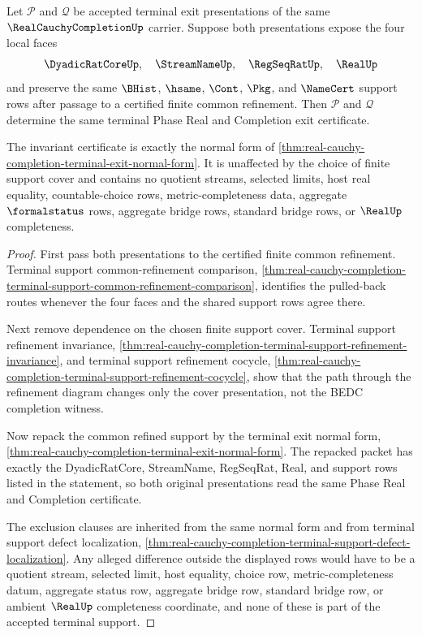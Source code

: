 \begin{theorem}
\label{thm:real-cauchy-completion-terminal-exit-support-invariance}
Let $\mathcal P$ and $\mathcal Q$ be accepted terminal exit presentations of the same $\RealCauchyCompletionUp$ carrier. Suppose both presentations expose the four local faces
$$
\DyadicRatCoreUp,\quad \StreamNameUp,\quad \RegSeqRatUp,\quad \RealUp
$$
and preserve the same $\BHist$, $\hsame$, $\Cont$, $\Pkg$, and $\NameCert$ support rows after passage to a certified finite common refinement. Then $\mathcal P$ and $\mathcal Q$ determine the same terminal Phase Real and Completion exit certificate.

The invariant certificate is exactly the normal form of \autoref{thm:real-cauchy-completion-terminal-exit-normal-form}. It is unaffected by the choice of finite support cover and contains no quotient streams, selected limits, host real equality, countable-choice rows, metric-completeness data, aggregate $\formalstatus$ rows, aggregate bridge rows, standard bridge rows, or $\RealUp$ completeness.
\end{theorem}
\begin{proof}
First pass both presentations to the certified finite common refinement. Terminal support common-refinement comparison, \autoref{thm:real-cauchy-completion-terminal-support-common-refinement-comparison}, identifies the pulled-back routes whenever the four faces and the shared support rows agree there.

Next remove dependence on the chosen finite support cover. Terminal support refinement invariance, \autoref{thm:real-cauchy-completion-terminal-support-refinement-invariance}, and terminal support refinement cocycle, \autoref{thm:real-cauchy-completion-terminal-support-refinement-cocycle}, show that the path through the refinement diagram changes only the cover presentation, not the BEDC completion witness.

Now repack the common refined support by the terminal exit normal form, \autoref{thm:real-cauchy-completion-terminal-exit-normal-form}. The repacked packet has exactly the DyadicRatCore, StreamName, RegSeqRat, Real, and support rows listed in the statement, so both original presentations read the same Phase Real and Completion certificate.

The exclusion clauses are inherited from the same normal form and from terminal support defect localization, \autoref{thm:real-cauchy-completion-terminal-support-defect-localization}. Any alleged difference outside the displayed rows would have to be a quotient stream, selected limit, host equality, choice row, metric-completeness datum, aggregate status row, aggregate bridge row, standard bridge row, or ambient $\RealUp$ completeness coordinate, and none of these is part of the accepted terminal support.
\end{proof}
